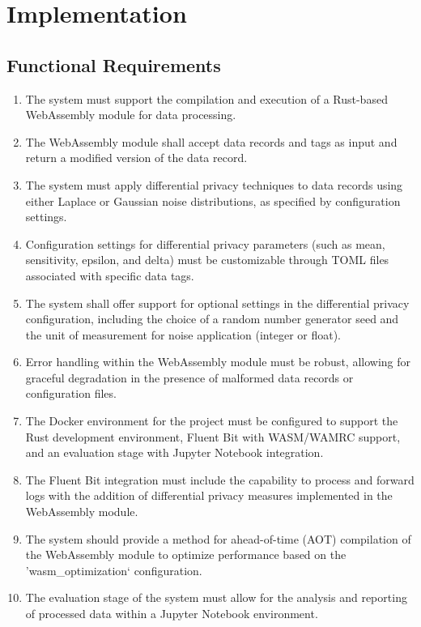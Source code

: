\chapter{Implementation\label{chap:implementation}}
\section{Functional Requirements}

\begin{enumerate}
    \item The system must support the compilation and execution of a Rust-based WebAssembly module for data processing.
    \item The WebAssembly module shall accept data records and tags as input and return a modified version of the data record.
    \item The system must apply differential privacy techniques to data records using either Laplace or Gaussian noise distributions, as specified by configuration settings.
    \item Configuration settings for differential privacy parameters (such as mean, sensitivity, epsilon, and delta) must be customizable through TOML files associated with specific data tags.
    \item The system shall offer support for optional settings in the differential privacy configuration, including the choice of a random number generator seed and the unit of measurement for noise application (integer or float).
    \item Error handling within the WebAssembly module must be robust, allowing for graceful degradation in the presence of malformed data records or configuration files.
    \item The Docker environment for the project must be configured to support the Rust development environment, Fluent Bit with WASM/WAMRC support, and an evaluation stage with Jupyter Notebook integration.
    \item The Fluent Bit integration must include the capability to process and forward logs with the addition of differential privacy measures implemented in the WebAssembly module.
    \item The system should provide a method for ahead-of-time (AOT) compilation of the WebAssembly module to optimize performance based on the 'wasm\_optimization` configuration.
    \item The evaluation stage of the system must allow for the analysis and reporting of processed data within a Jupyter Notebook environment.
\end{enumerate}

